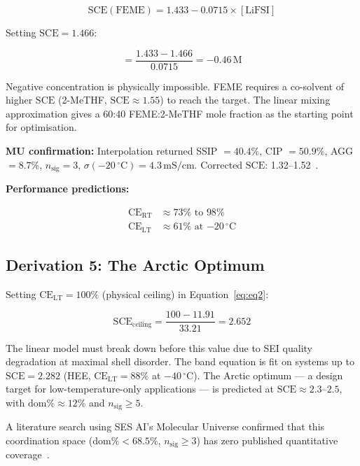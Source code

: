 \documentclass[12pt,letterpaper]{article}
\newcommand{\mSCE}{\mathrm{SCE}}
\newcommand{\mCERT}{\mathrm{CE}_{\mathrm{RT}}}
\newcommand{\mCELT}{\mathrm{CE}_{\mathrm{LT}}}
\begin{document}
\begin{equation}
  \mSCE(\text{FEME})
  = 1.433 - 0.0715 \times [\mathrm{LiFSI}]
  \label{eq:feme}
\end{equation}

Setting $\mSCE = 1.466$:

\begin{equation}
  [\mathrm{LiFSI}]
  = \frac{1.433 - 1.466}{0.0715} = -0.46\,\mathrm{M}
\end{equation}

Negative concentration is physically impossible.
FEME requires a co-solvent of higher $\mSCE$
(2-MeTHF, $\mSCE \approx 1.55$) to reach the target.
The linear mixing approximation gives a 60:40
FEME:2-MeTHF mole fraction as the starting point
for optimisation.

\textbf{MU confirmation:} Interpolation returned
SSIP $= 40.4\%$, CIP $= 50.9\%$,
AGG $= 8.7\%$, $n_{\mathrm{sig}} = 3$,
$\sigma(-20\,^{\circ}\mathrm{C}) = 4.3\,\mathrm{mS/cm}$.
Corrected $\mSCE$: 1.32--1.52~\cite{mu2026query3}.

\textbf{Performance predictions:}

\begin{align}
  \mCERT &\approx 73\% \text{ to } 98\%\\
  \mCELT &\approx 61\%
  \text{ at } {-20\,^{\circ}\mathrm{C}}
\end{align}

\subsection{Derivation 5: The Arctic Optimum}
\label{sec:arctic}

Setting $\mCELT = 100\%$ (physical ceiling)
in Equation~\ref{eq:eq2}:

\begin{equation}
  \mSCE_{\mathrm{ceiling}}
  = \frac{100 - 11.91}{33.21} = 2.652
\end{equation}

The linear model must break down before this value due
to SEI quality degradation at maximal shell disorder.
The band equation is fit on systems up to
$\mSCE = 2.282$ (HEE,
$\mCELT = 88\%$ at $-40\,^{\circ}\mathrm{C}$).
The Arctic optimum --- a design target for
low-temperature-only applications --- is predicted at
$\mSCE \approx 2.3$--$2.5$, with
$\mathrm{dom\%} \approx 12\%$ and
$n_{\mathrm{sig}} \geq 5$.

A literature search using SES AI's Molecular Universe
confirmed that this coordination space
($\mathrm{dom\%} < 68.5\%$, $n_{\mathrm{sig}} \geq 3$)
has zero published quantitative
coverage~\cite{mu2026query4}.
\end{document}
